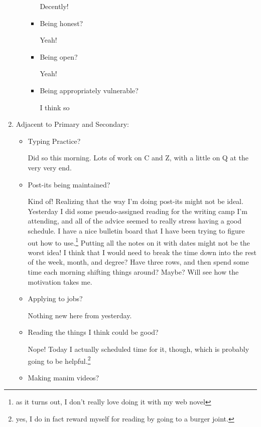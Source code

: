 \documentclass[12pt]{article}
\renewcommand{\,}{\textsuperscript{,}}
\begin{document}
\begin{enumerate}
\begin{itemize}
\begin{itemize}
Decently!

\item Being honest?

Yeah!

\item Being open?

Yeah!

\item Being appropriately vulnerable?

I think so

\end{itemize}

\end{itemize}

\item Adjacent to Primary and Secondary:

\begin{itemize}

\item Typing Practice?

Did so this morning. Lots of work on C and Z, with a little on Q at the very very end.

\item Post-its being maintained?

Kind of! Realizing that the way I'm doing post-its might not be ideal.  
Yesterday I did some pseudo-assigned reading for the writing camp I'm attending, and all of the advice seemed to really stress having a good schedule.  
I have a nice bulletin board that I have been trying to figure out how to use.\footnote{as it turns out, I don't really love doing it with my web novel}  
Putting all the notes on it with dates might not be the worst idea!  
I think that I would need to break the time down into the rest of the week, month, and degree? Have three rows, and then spend some time each morning shifting things around? Maybe? Will see how the motivation takes me.

\item Applying to jobs?

Nothing new here from yesterday.

\item Reading the things I think could be good?

Nope! Today I actually scheduled time for it, though, which is probably going to be helpful.\footnote{yes, I do in fact reward myself for reading by going to a burger joint.}

\item Making manim videos?


\end{itemize}
\end{enumerate}
\end{document}
